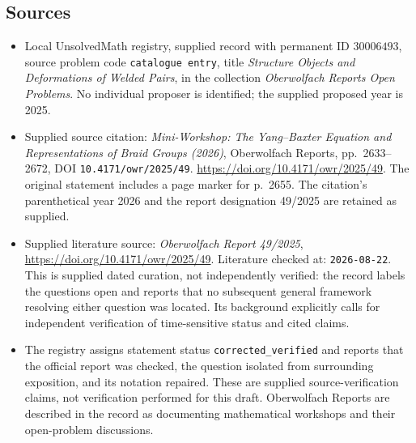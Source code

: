 \documentclass[11pt]{article}
\begin{document}
\subsection{Sources}
\begin{itemize}
\item Local UnsolvedMath registry, supplied record with permanent ID \(30006493\), source problem code \texttt{catalogue entry}, title \emph{Structure Objects and Deformations of Welded Pairs}, in the collection \emph{Oberwolfach Reports Open Problems}. No individual proposer is identified; the supplied proposed year is 2025.
\item Supplied source citation: \emph{Mini-Workshop: The Yang--Baxter Equation and Representations of Braid Groups (2026)}, Oberwolfach Reports, pp.\ 2633--2672, DOI \texttt{10.4171/owr/2025/49}. \url{https://doi.org/10.4171/owr/2025/49}. The original statement includes a page marker for p.\ 2655. The citation's parenthetical year 2026 and the report designation 49/2025 are retained as supplied.
\item Supplied literature source: \emph{Oberwolfach Report 49/2025}, \url{https://doi.org/10.4171/owr/2025/49}. Literature checked at: \texttt{2026-08-22}. This is supplied dated curation, not independently verified: the record labels the questions open and reports that no subsequent general framework resolving either question was located. Its background explicitly calls for independent verification of time-sensitive status and cited claims.
\item The registry assigns statement status \texttt{corrected\_verified} and reports that the official report was checked, the question isolated from surrounding exposition, and its notation repaired. These are supplied source-verification claims, not verification performed for this draft. Oberwolfach Reports are described in the record as documenting mathematical workshops and their open-problem discussions.
\end{itemize}
\end{document}
